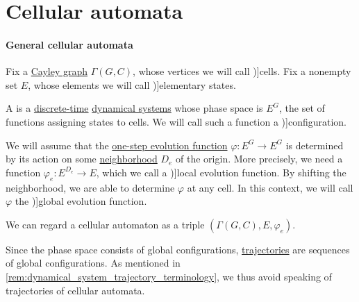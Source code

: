 \section{Cellular automata}\label{sec:cellular_automata}

\paragraph{General cellular automata}

\begin{definition}\label{def:cellular_automaton}
  Fix a \hyperref[def:cayley_graph]{Cayley graph} \( \Gamma(G, C) \), whose vertices we will call \term[en=cell (\cite[def. 2.1.3]{HadelerMüller2017CellularAutomata})]{cells}. Fix a nonempty set \( E \), whose elements we will call \term[en=elementary state (\cite[def. 2.3.1]{HadelerMüller2017CellularAutomata})]{elementary states}.

  A  is a \hyperref[def:discrete_dynamical_system]{discrete-time} \hyperref[def:dynamical_system]{dynamical systems} whose phase space is \( E^G \), the set of functions assigning states to cells. We will call such a function a \term[en=configuration (\cite[def. 2.3.2]{HadelerMüller2017CellularAutomata})]{configuration}.

  We will assume that the \hyperref[def:one_step_evolution_function]{one-step evolution function} \( \varphi: E^G \to E^G \) is determined by its action on some \hyperref[def:cayley_graph_neighborhood]{neighborhood} \( D_e \) of the origin. More precisely, we need a function \( \varphi_e: E^{D_e} \to E \), which we call a \term[en=local function (\cite[def. 2.4.1]{HadelerMüller2017CellularAutomata})]{local evolution function}. By shifting the neighborhood, we are able to determine \( \varphi \) at any cell. In this context, we will call \( \varphi \) the \term[en=global function (\cite[def. 2.4.1]{HadelerMüller2017CellularAutomata})]{global evolution function}.
\end{definition}
\begin{comments}
  \item We can regard a cellular automaton as a triple \( (\Gamma(G, C), E, \varphi_e) \).

  \item Since the phase space consists of global configurations, \hyperref[def:dynamical_system_trajectory]{trajectories} are sequences of global configurations. As mentioned in \cref{rem:dynamical_system_trajectory_terminology}, we thus avoid speaking of trajectories of cellular automata.
\end{comments}

